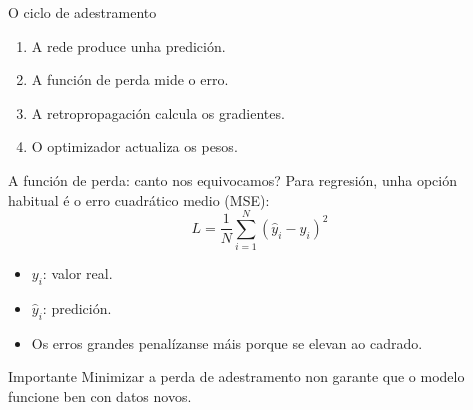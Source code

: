 \documentclass[aspectratio=169,10pt]{beamer}
\begin{document}
\begin{frame}{O ciclo de adestramento}
  \begin{center}
  \end{center}
  \begin{enumerate}
    \item A rede produce unha predición.
    \item A función de perda mide o erro.
    \item A retropropagación calcula os gradientes.
    \item O optimizador actualiza os pesos.
  \end{enumerate}
\end{frame}

\begin{frame}{A función de perda: canto nos equivocamos?}
  Para regresión, unha opción habitual é o erro cuadrático medio (MSE):
  \[
    L=\frac{1}{N}\sum_{i=1}^{N}(\hat y_i-y_i)^2
  \]
  \begin{itemize}
    \item \(y_i\): valor real.
    \item \(\hat y_i\): predición.
    \item Os erros grandes penalízanse máis porque se elevan ao cadrado.
  \end{itemize}
  \begin{block}{Importante}
    Minimizar a perda de adestramento non garante que o modelo funcione ben con datos novos.
  \end{block}
\end{frame}
\end{document}
